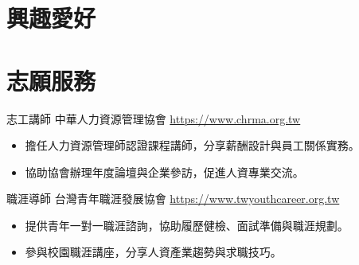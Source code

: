 \documentclass[a4paper, serif, 10pt]{moderncv}
\begin{document}
\section{興趣愛好}

\section{志願服務}

        {志工講師}
        {中華人力資源管理協會}
        {\url{https://www.chrma.org.tw}}
        {}
        {\begin{itemize}
\item 擔任人力資源管理師認證課程講師，分享薪酬設計與員工關係實務。
\item 協助協會辦理年度論壇與企業參訪，促進人資專業交流。
\end{itemize}}
    

        {職涯導師}
        {台灣青年職涯發展協會}
        {\url{https://www.twyouthcareer.org.tw}}
        {}
        {\begin{itemize}
\item 提供青年一對一職涯諮詢，協助履歷健檢、面試準備與職涯規劃。
\item 參與校園職涯講座，分享人資產業趨勢與求職技巧。
\end{itemize}}
    
\end{document}
